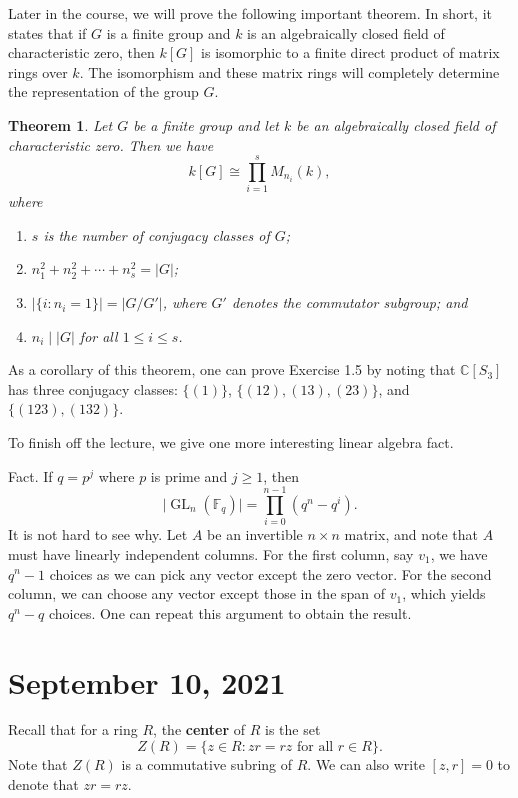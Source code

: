 \documentclass[10pt]{article}
\numberwithin{equation}{section}
\newcommand{\C}{\mathbb{C}}
\newcommand{\F}{\mathbb{F}}
\DeclareMathOperator{\GL}{GL}
\theoremstyle{newstyle}
\newtheorem{thm}{Theorem}[section]
\begin{document}
Later in the course, we will prove the following important theorem. In short, it states that if 
$G$ is a finite group and $k$ is an algebraically closed field of characteristic zero, then $k[G]$ is
isomorphic to a finite direct product of matrix rings over $k$. The isomorphism and these matrix rings
will completely determine the representation of the group $G$. 

\begin{thm}
Let $G$ be a finite group and let $k$ be an algebraically closed field of characteristic zero. 
Then we have 
\[ k[G] \cong \prod_{i=1}^s M_{n_i}(k), \]
where
\begin{enumerate}[(1)]
    \item $s$ is the number of conjugacy classes of $G$;
    \item $n_1^2 + n_2^2 + \cdots + n_s^2 = |G|$;
    \item $|\{i : n_i = 1\}| = |G/G'|$, where $G'$ denotes the commutator subgroup; and 
    \item $n_i \mid |G|$ for all $1 \leq i \leq s$. 
\end{enumerate}
\end{thm}

As a corollary of this theorem, one can prove Exercise 1.5 by noting that $\C[S_3]$ has three 
conjugacy classes: $\{(1)\}$, $\{(12), (13), (23)\}$, and $\{(123), (132)\}$. 

To finish off the lecture, we give one more interesting linear algebra fact. 

{\sc Fact.} If $q = p^j$ where $p$ is prime and $j \geq 1$, then 
\[ \lvert\GL_n(\F_q)\rvert = \prod_{i=0}^{n-1} (q^n - q^i). \]
It is not hard to see why. Let $A$ be an invertible $n \times n$ matrix, and note that $A$ must 
have linearly independent columns. For the first column, say $v_1$, we have 
$q^n - 1$ choices as we can pick any vector except the zero vector. For the second column, 
we can choose any vector except those in the span of $v_1$, which yields $q^n - q$ choices. 
One can repeat this argument to obtain the result. 

\section{September 10, 2021}

Recall that for a ring $R$, the {\bf center} of $R$ is the set 
\[ Z(R) = \{z \in R : zr = rz \text{ for all } r \in R\}. \]
Note that $Z(R)$ is a commutative subring of $R$. We can also write $[z, r] = 0$ to 
denote that $zr = rz$. 
\end{document}
